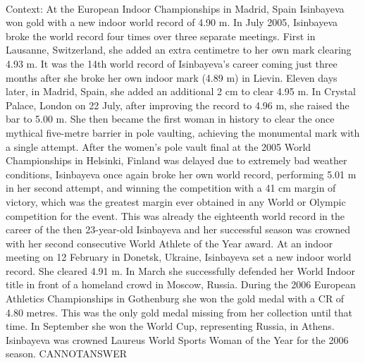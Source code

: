 \documentclass[11pt,a4paper, onecolumn]{article}
\begin{document}
\\ Context: At the European Indoor Championships in Madrid, Spain Isinbayeva won gold with a new indoor world record of 4.90 m. In July 2005, Isinbayeva broke the world record four times over three separate meetings. First in Lausanne, Switzerland, she added an extra centimetre to her own mark clearing 4.93 m. It was the 14th world record of Isinbayeva's career coming just three months after she broke her own indoor mark (4.89 m) in Lievin. Eleven days later, in Madrid, Spain, she added an additional 2 cm to clear 4.95 m. In Crystal Palace, London on 22 July, after improving the record to 4.96 m, she raised the bar to 5.00 m. She then became the first woman in history to clear the once mythical five-metre barrier in pole vaulting, achieving the monumental mark with a single attempt. After the women's pole vault final at the 2005 World Championships in Helsinki, Finland was delayed due to extremely bad weather conditions, Isinbayeva once again broke her own world record, performing 5.01 m in her second attempt, and winning the competition with a 41 cm margin of victory, which was the greatest margin ever obtained in any World or Olympic competition for the event. This was already the eighteenth world record in the career of the then 23-year-old Isinbayeva and her successful season was crowned with her second consecutive World Athlete of the Year award. At an indoor meeting on 12 February in Donetsk, Ukraine, Isinbayeva set a new indoor world record. She cleared 4.91 m. In March she successfully defended her World Indoor title in front of a homeland crowd in Moscow, Russia. During the 2006 European Athletics Championships in Gothenburg she won the gold medal with a CR of 4.80 metres. This was the only gold medal missing from her collection until that time. In September she won the World Cup, representing Russia, in Athens. Isinbayeva was crowned Laureus World Sports Woman of the Year for the 2006 season. CANNOTANSWER
\end{document}
